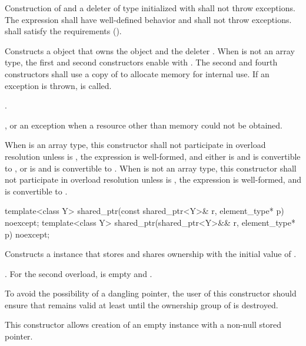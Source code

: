 \begin{itemdescr}
\pnum\requires Construction of  and a deleter of type 
initialized with  shall not throw exceptions.
The expression 
shall have well-defined behavior and shall not throw exceptions.
 shall satisfy the  requirements
().

\pnum\effects  Constructs a  object that owns the
object  and the deleter .
When  is not an array type,
the first and second constructors enable  with .
The second and fourth constructors shall use a copy of  to
allocate memory for internal use.
If an exception is thrown,  is called.

\pnum\ensures  {}.

\pnum\throws  {}, or an  exception
when a resource other than memory could not be obtained.

\pnum\remarks
When  is an array type,
this constructor shall not participate in overload resolution unless
 is ,
the expression  is well-formed, and either
 is  and  is convertible to , or
 is  and  is convertible to .
When  is not an array type,
this constructor shall not participate in overload resolution unless
 is ,
the expression  is well-formed, and
 is convertible to .
\end{itemdescr}

%
\begin{itemdecl}
template<class Y> shared_ptr(const shared_ptr<Y>& r, element_type* p) noexcept;
template<class Y> shared_ptr(shared_ptr<Y>&& r, element_type* p) noexcept;
\end{itemdecl}

\begin{itemdescr}
\pnum
\effects Constructs a  instance that
stores  and shares ownership with
the initial value of .

\pnum
\ensures {}.
For the second overload,
 is empty and .

\pnum
\begin{note} To avoid the possibility of a dangling pointer, the
user of this constructor should ensure that  remains valid at
least until the ownership group of  is destroyed. \end{note}

\pnum
\begin{note} This constructor allows creation of an empty
 instance with a non-null stored pointer. \end{note}
\end{itemdescr}

